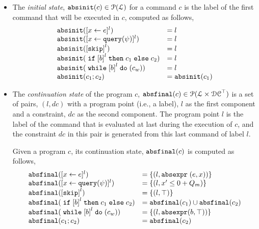\begin{itemize}
 \item The \emph{initial state}, $\mathtt{abs}{\mathtt{init}}(c) \in \mathcal{P}(\mathcal{L})$
 for a command $c$ is the label of the first command that will be executed in $c$,
 computed as follows,
%
\[
 \begin{array}{ll}
 \absinit(\clabel{\assign{x}{\expr}}{}^l) & = l \\
 \absinit(\clabel{\assign{x}{\query(\qexpr)}}{}^l) & = l \\
 \absinit(\clabel{\eskip}^{l}) & = l \\
 \absinit(\eif \clabel{\bexpr}^{l} \ethen c_1 \eelse c_2) & = l\\
 \absinit(\ewhile \clabel{\bexpr}^{l} \edo (c_w)) & = l \\
 \absinit(c_1 ; c_2) & = \absinit(c_1) \\
 \end{array}
 \]
\item The \emph{continuation state} of the program $c$, 
$\mathtt{abs}{\mathtt{final}}(c) \in \mathcal{P}(\mathcal{L} \times \mathcal{DC}^{\top})$
is a set of pairs, $(l, dc)$ with a
program point (i.e., a label), $l$ as the first component and a constraint, 
$dc$ as the second component.
The program point $l$ is the label of the command that is evaluated at last during the execution of $c$,
and the constraint $dc$ in this pair is generated from this last command of label $l$.

Given a program $c$, its continuation state, $\mathtt{abs}{\mathtt{final}}(c)$ is computed as follows,
 \[
 \begin{array}{ll}
 \absfinal(\clabel{\assign{x}{\expr}}{}^l) & = \{(l, \absexpr\eapp (\expr, x))\} \\
 \absfinal(\clabel{\assign{x}{\query(\qexpr)}}{}^l) & = \{
 (l, x' \leq 0 + Q_m )\} \\
 \absfinal(\clabel{\eskip}^{l}) 
 & = \{(l, \top)\} \\
 \absfinal(\eif \clabel{\bexpr}^{l} \ethen c_1 \eelse c_2) & = \absfinal(c_1) \cup \absfinal(c_2) \\
 \absfinal(\ewhile \clabel{\bexpr}^{l} \edo (c_w)) & = \{(l, \absexpr(\bexpr, \top))\} \\
 \absfinal(c_1 ; c_2) & = \absfinal(c_2) \\
 \end{array}
 \]
\end{itemize}
